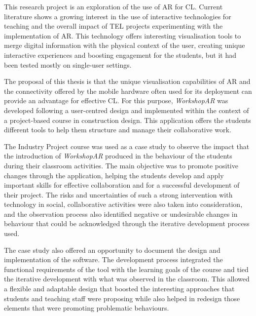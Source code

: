 %

This research project is an exploration of the use of \ac{AR} for \ac{CL}. Current literature shows a growing interest in the use of interactive technologies for teaching and the overall
impact of \ac{TEL} projects experimenting with the implementation of \ac{AR}. This technology offers interesting visualisation tools to merge digital information with the physical context
of the user, creating unique interactive experiences and boosting engagement for the students, but it had been tested mostly on single-user settings.

The proposal of this thesis is that the unique visualisation capabilities of \ac{AR} and the connectivity offered by the mobile hardware often used for its deployment can provide an
advantage for effective \ac{CL}. For this purpose, \emph{WorkshopAR} was developed following a user-centred design and implemented within the context of a project-based course in
construction design. This application offers the students different tools to help them structure and manage their collaborative work.

The Industry Project course was used as a case study to observe the impact that the introduction of \emph{WorkshopAR} produced in the behaviour of the students during their classroom
activities. The main objective was to promote positive changes through the application, helping the students develop and apply important skills for effective collaboration and for a
successful development of their project. The risks and uncertainties of such a strong intervention with technology in social, collaborative activities were also taken into consideration,
and the observation process also identified negative or undesirable changes in behaviour that could be acknowledged through the iterative development process used.

The case study also offered an opportunity to document the design and implementation of the software. The development process integrated the functional requirements of the tool with the
learning goals of the course and tied the iterative development with what was observed in the classroom. This allowed a flexible and adaptable design that boosted the interesting
approaches that students and teaching staff were proposing while also helped in redesign those elements that were promoting problematic behaviours.

